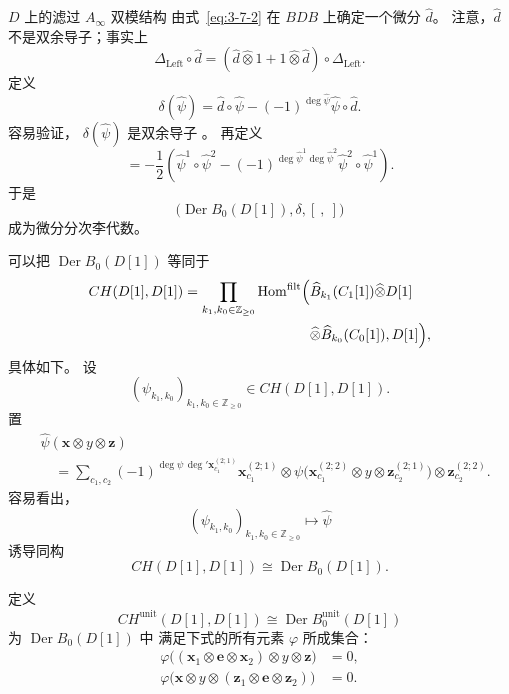 $D$ 上的滤过 $A_\infty$ 双模结构
由式~\eqref{eq:3-7-2}
在 $BDB$ 上确定一个微分 $\widehat d$。
注意，$\widehat d$ 不是双余导子；事实上
\[
\Delta_{\mathrm{Left}}\circ\widehat d
=
(\widehat d\widehat\otimes1
+1\widehat\otimes\widehat d)
\circ\Delta_{\mathrm{Left}}.
\]
定义
\begin{equation}
\delta(\widehat\psi)
=\widehat d\circ\widehat\psi
-(-1)^{\deg\widehat\psi}
\widehat\psi\circ\widehat d.
\tag{7.4.141.1}\label{eq:7-4-141-1}
\end{equation}
容易验证，
$\delta(\widehat\psi)$ 是双余导子
。
再定义
\begin{equation}
[\widehat\psi^1,\widehat\psi^2]
=-\frac12\left(
\widehat\psi^1\circ\widehat\psi^2
-(-1)^{\deg\widehat\psi^1\deg\widehat\psi^2}
\widehat\psi^2\circ\widehat\psi^1
\right).
\tag{7.4.141.2}\label{eq:7-4-141-2}
\end{equation}
于是
\[
\bigl(\operatorname{Der}B_0(D[1]),
\delta,[\ ,\ ]\bigr)
\]
成为微分分次李代数。

可以把 $\operatorname{Der}B_0(D[1])$
等同于
\[
\begin{aligned}
CH(D[1],D[1])
=\prod_{k_1,k_0\in\mathbb Z_{\ge0}}
\operatorname{Hom}^{\mathrm{filt}}\Bigl(
&\widehat B_{k_1}(C_1[1])
\widehat\otimes D[1]\\
&\widehat\otimes
\widehat B_{k_0}(C_0[1]),D[1]\Bigr),
\end{aligned}
\]
具体如下。
设
\[
(\psi_{k_1,k_0})_{k_1,k_0\in\mathbb Z_{\ge0}}
\in CH(D[1],D[1]).
\]
置
\[
\begin{aligned}
&\widehat\psi(\mathbf x\otimes y\otimes\mathbf z)\\
&\quad=
\sum_{c_1,c_2}
(-1)^{
\deg\psi\,
\deg'\mathbf x_{c_1}^{(2;1)}}
\mathbf x_{c_1}^{(2;1)}
\otimes
\psi\bigl(
\mathbf x_{c_1}^{(2;2)}
\otimes y\otimes
\mathbf z_{c_2}^{(2;1)}
\bigr)
\otimes
\mathbf z_{c_2}^{(2;2)}.
\end{aligned}
\]
容易看出，
\[
(\psi_{k_1,k_0})_{k_1,k_0\in\mathbb Z_{\ge0}}
\longmapsto\widehat\psi
\]
诱导同构
\begin{equation}
CH(D[1],D[1])
\cong\operatorname{Der}B_0(D[1]).
\tag{7.4.142}\label{eq:7-4-142}
\end{equation}

定义
\[
CH^{\mathrm{unit}}(D[1],D[1])
\cong
\operatorname{Der}B^{\mathrm{unit}}_0(D[1])
\]
为 $\operatorname{Der}B_0(D[1])$ 中
满足下式的所有元素 $\varphi$ 所成集合：
\[
\begin{aligned}
\varphi\bigl(
(\mathbf x_1\otimes\mathbf e\otimes\mathbf x_2)
\otimes y\otimes\mathbf z
\bigr)
&=0,\\
\varphi\bigl(
\mathbf x\otimes y\otimes
(\mathbf z_1\otimes\mathbf e\otimes\mathbf z_2)
\bigr)
&=0.
\end{aligned}
\]

